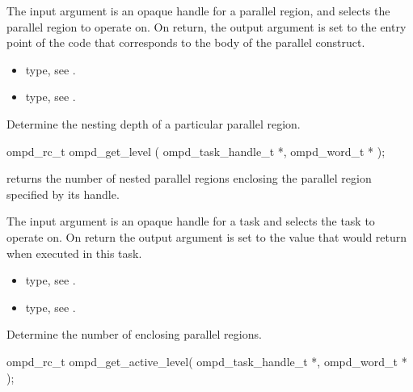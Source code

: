 \descr

\argdesc
The input argument  is an opaque handle for a
parallel region, and selects the parallel region to operate on.
On return,  the output argument  is set to the
entry point of the code that corresponds to the body of the parallel
construct.

\crossreferences
\begin{itemize}
	\item {} type, see .
	\item {} type, see .
\end{itemize}


\label{ompd:ompd_get_level}
\summary
Determine the nesting depth of a particular parallel region.

\format
\begin{cspecific}
\begin{ompSyntax}
ompd_rc_t ompd_get_level (
  ompd_task_handle_t *,
  ompd_word_t *
);
\end{ompSyntax}
\end{cspecific}

\descr
{} returns the number of nested
parallel regions enclosing the parallel region specified by its handle.

\argdesc
The input argument  is an opaque handle for a task and selects the task to operate on.
On return the output argument  is set to the value that  would return 
when executed in this task.


\crossreferences
\begin{itemize}
	\item {} type, see .
	\item {} type, see .
\end{itemize}


\label{ompd:ompd_get_active_level}
\summary
Determine the number of enclosing  parallel regions.

\format
\begin{cspecific}
\begin{ompSyntax}
ompd_rc_t ompd_get_active_level(
  ompd_task_handle_t *,
  ompd_word_t *
);
\end{ompSyntax}
\end{cspecific}

